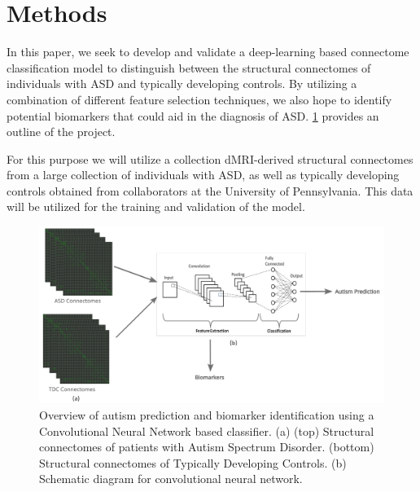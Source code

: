 \section{Methods}

In this paper, we seek to develop and validate a deep-learning based connectome classification 
model to distinguish between the structural connectomes of individuals with ASD and typically 
developing controls. By utilizing a combination of different feature selection techniques, 
we also hope to identify potential biomarkers that could aid in the diagnosis of ASD. 
\cref{project-schematic} provides an outline of the project. 

For this purpose we will utilize a collection dMRI-derived structural connectomes from a large 
collection of individuals with ASD, as well as typically developing controls obtained from 
collaborators at the University of Pennsylvania. This data will be utilized for the training 
and validation of the model.

\begin{figure}[ht]
    \vskip 0.2in
    \begin{center}
        \centerline{\includegraphics[width=\columnwidth]{../figures/project_schematic_v1.png}}
        \caption{Overview of autism prediction and biomarker identification using a Convolutional
                 Neural Network based classifier. (a) (top) Structural connectomes of patients 
                 with Autism Spectrum Disorder. (bottom) Structural connectomes of Typically 
                 Developing Controls. (b) Schematic diagram for convolutional neural network.}
        \label{project-schematic}
    \end{center}
    \vskip -0.2in
\end{figure}
